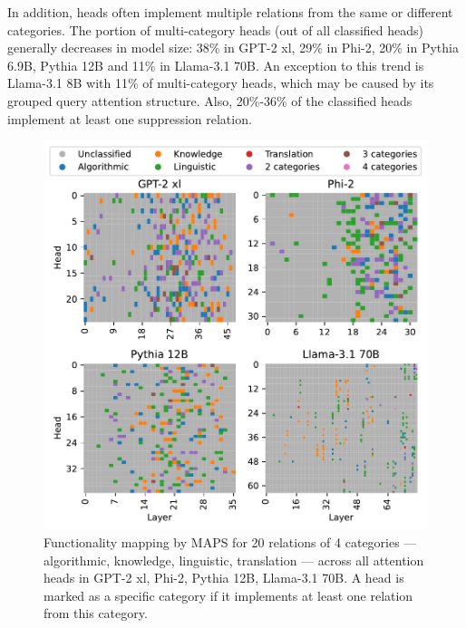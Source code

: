 \documentclass[11pt]{article}
\newcommand{\llamaThreeSeventyB}{Llama-3.1 70B}
\newcommand{\llamaThreeEightB}{Llama-3.1 8B}
\newcommand{\PHI}{Phi-2}
\newcommand{\PythiaTwelveB}{Pythia 12B}
\newcommand{\PythiaSevenB}{Pythia 6.9B}
\newcommand{\GPTxl}{GPT-2 xl}
\newcommand{\framework}{\textsc{MAPS}}
\begin{document}
In addition, heads often implement multiple relations from the same or different categories. The portion of multi-category heads (out of all classified heads) generally decreases in model size: 38\% in \GPTxl{}, 29\% in \PHI{}, 20\% in \PythiaSevenB{}, \PythiaTwelveB{} and 11\% in \llamaThreeSeventyB{}. An exception to this trend is \llamaThreeEightB{} with 11\% of multi-category heads, which may be caused by its grouped query attention structure.
Also, 20\%-36\% of the classified heads implement at least one suppression relation.


\begin{figure}[t]
\setlength\belowcaptionskip{-8px}
    \centering
    \includegraphics[scale=0.5]{figures/classified_heads/classified_attn_heads_multiple_models_threshold_0.15}
    \caption{Functionality mapping  by \framework{} for 20 relations of 4 categories --- algorithmic, knowledge, linguistic, translation --- across all attention heads in \GPTxl{}, \PHI{}, \PythiaTwelveB{}, \llamaThreeSeventyB{}. A head is marked as a specific category if it implements at least one relation from this category.}
    \label{fig:classified_attn_heads_multiple_models}
\end{figure}
\end{document}
